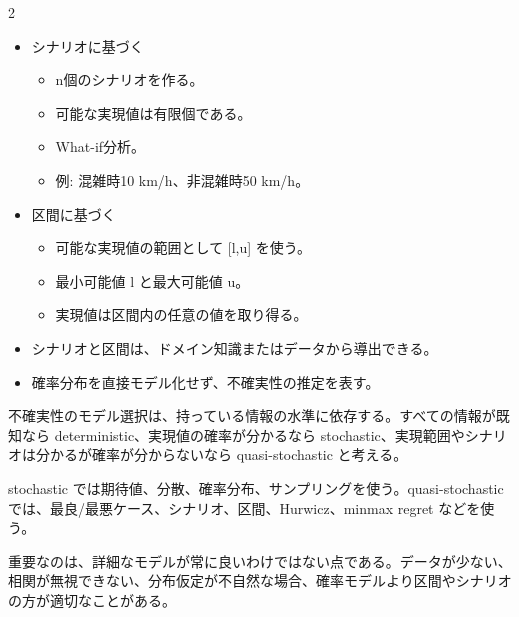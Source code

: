 \clearpage



\vspace{1.5mm}

\begin{multicols}{2}

\footnotesize

\raggedcolumns


\begin{itemize}
\item シナリオに基づく
\begin{itemize}
\item n個のシナリオを作る。
\item 可能な実現値は有限個である。
\item What-if分析。
\item 例: 混雑時10 km/h、非混雑時50 km/h。
\end{itemize}
\item 区間に基づく
\begin{itemize}
\item 可能な実現値の範囲として [l,u] を使う。
\item 最小可能値 l と最大可能値 u。
\item 実現値は区間内の任意の値を取り得る。
\end{itemize}
\item シナリオと区間は、ドメイン知識またはデータから導出できる。
\item 確率分布を直接モデル化せず、不確実性の推定を表す。
\end{itemize}

不確実性のモデル選択は、持っている情報の水準に依存する。すべての情報が既知なら deterministic、実現値の確率が分かるなら stochastic、実現範囲やシナリオは分かるが確率が分からないなら quasi-stochastic と考える。\par

stochastic では期待値、分散、確率分布、サンプリングを使う。quasi-stochastic では、最良/最悪ケース、シナリオ、区間、Hurwicz、minmax regret などを使う。\par

重要なのは、詳細なモデルが常に良いわけではない点である。データが少ない、相関が無視できない、分布仮定が不自然な場合、確率モデルより区間やシナリオの方が適切なことがある。\par


\end{multicols}
